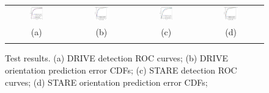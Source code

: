 \documentclass{IEEEtran}
\begin{document}
\begin{figure}[t]
\centering
\begin{tabular}{@{}c c c c@{}} %
\includegraphics[width=0.24\textwidth]{figs/retina/DRIVE_test_detection_roc_zoom} &
\includegraphics[width=0.24\textwidth]{figs/retina/DRIVE_test_orientation_cdf} &
\includegraphics[width=0.24\textwidth]{figs/retina/STARE_detection_roc_zoom} &
\includegraphics[width=0.24\textwidth]{figs/retina/STARE_orientation_cdf} \\
%
(a) & (b) & (c) & (d) \\
%
\noalign{\smallskip}
\end{tabular}
%
\caption{Test results. %
(a) DRIVE detection ROC curves; %
(b) DRIVE orientation prediction error CDFs; %
(c) STARE detection ROC curves; %
(d) STARE orientation prediction error CDFs; %
}
\label{f:retinal results}
\end{figure}
%
\end{document}
